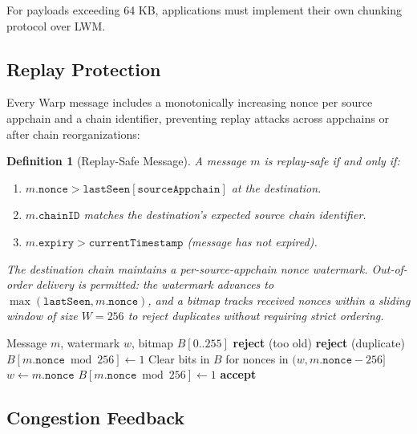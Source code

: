\documentclass[11pt,a4paper]{article}
\newtheorem{definition}{Definition}
\begin{document}
For payloads exceeding 64 KB, applications must implement their own chunking protocol over LWM.

\subsection{Replay Protection}

Every Warp message includes a monotonically increasing nonce per source appchain and a chain identifier, preventing replay attacks across appchains or after chain reorganizations:

\begin{definition}[Replay-Safe Message]
A message $m$ is replay-safe if and only if:
\begin{enumerate}
    \item $m.\texttt{nonce} > \texttt{lastSeen}[\texttt{sourceAppchain}]$ at the destination.
    \item $m.\texttt{chainID}$ matches the destination's expected source chain identifier.
    \item $m.\texttt{expiry} > \texttt{currentTimestamp}$ (message has not expired).
\end{enumerate}
The destination chain maintains a per-source-appchain nonce watermark. Out-of-order delivery is permitted: the watermark advances to $\max(\texttt{lastSeen}, m.\texttt{nonce})$, and a bitmap tracks received nonces within a sliding window of size $W = 256$ to reject duplicates without requiring strict ordering.
\end{definition}

\begin{algorithm}
\caption{Nonce Verification with Bitmap}
\begin{algorithmic}[1]
\Require Message $m$, watermark $w$, bitmap $B[0..255]$
    \State \Return \textbf{reject} (too old)
\EndIf
{}
        \State \Return \textbf{reject} (duplicate)
    \EndIf
    \State $B[m.\texttt{nonce} \bmod 256] \gets 1$
\Else
    \State Clear bits in $B$ for nonces in $(w, m.\texttt{nonce} - 256]$
    \State $w \gets m.\texttt{nonce}$
    \State $B[m.\texttt{nonce} \bmod 256] \gets 1$
\EndIf
\State \Return \textbf{accept}
\end{algorithmic}
\end{algorithm}

\subsection{Congestion Feedback}
\end{document}
